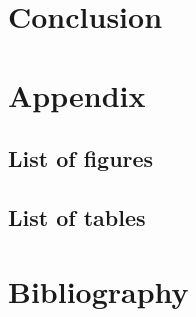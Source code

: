 \documentclass[pointlessnumbers, abstracton, headsepline, a4paper]{scrartcl}
\begin{document}
\section{Conclusion}

\clearpage
\appendix
\section{Appendix}

\subsection{List of figures}

\subsection{List of tables}

\section{Bibliography}
\end{document}
